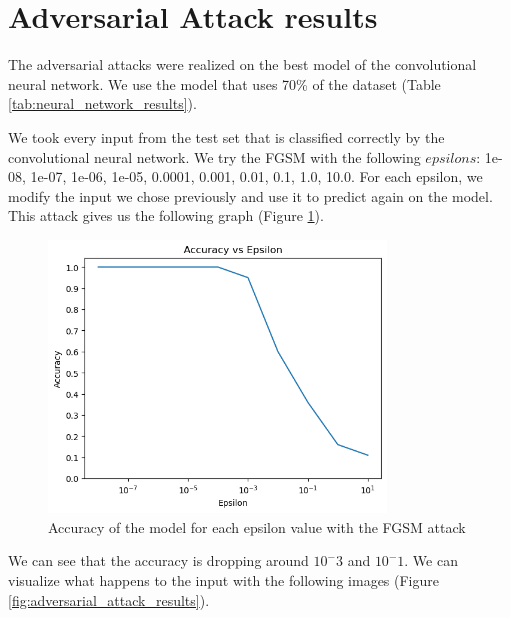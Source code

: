 \section{Adversarial Attack results}

The adversarial attacks were realized on the best model of the convolutional neural network. We use the model that uses 70\% of the dataset (Table \ref{tab:neural_network_results}).

We took every input from the test set that is classified correctly by the convolutional neural network. We try the FGSM with the following $epsilons$: 1e-08, 1e-07, 1e-06, 1e-05, 0.0001, 0.001, 0.01, 0.1, 1.0, 10.0. For each epsilon, we modify the input we chose previously and use it to predict again on the model. This attack gives us the following graph (Figure \ref{fig:fgsm_results}).

\begin{figure}[H]
    \centering
    \includegraphics[width=0.8\textwidth]{images/fgsm_results.png}
    \caption{Accuracy of the model for each epsilon value with the FGSM attack}
    \label{fig:fgsm_results}
\end{figure}

We can see that the accuracy is dropping around $10^-3$ and $10^-1$. We can visualize what happens to the input with the following images (Figure \ref{fig:adversarial_attack_results}).

